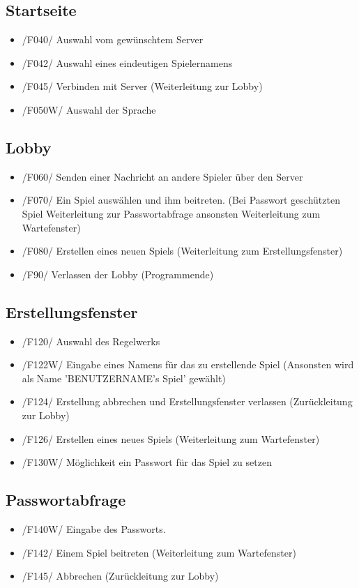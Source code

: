 \documentclass{article}
\begin{document}
\subsection{Startseite}
\begin{itemize}
	\item /F040/ Auswahl vom gewünschtem \gls{Server} 
	\item /F042/ Auswahl eines eindeutigen Spielernamens
	\item /F045/ Verbinden mit Server (Weiterleitung zur \gls{Lobby})
	\item /F050W/ Auswahl der Sprache
\end{itemize}

\subsection{\gls{Lobby}}
\begin{itemize}
	\item /F060/ Senden einer Nachricht an andere Spieler über den \gls{Server}
	\item /F070/ Ein Spiel auswählen und ihm beitreten. (Bei Passwort geschützten Spiel Weiterleitung zur Passwortabfrage ansonsten Weiterleitung zum \gls{Wartefenster})
	\item /F080/ Erstellen eines neuen Spiels (Weiterleitung zum \gls{Erstellungsfenster})
	\item /F90/ Verlassen der \gls{Lobby} (Programmende)
\end{itemize}

\subsection{\gls{Erstellungsfenster}}
\begin{itemize}
	\item /F120/ Auswahl des \gls{Regelwerk}s
	\item /F122W/ Eingabe eines Namens für das zu erstellende Spiel (Ansonsten wird als Name 'BENUTZERNAME's Spiel' gewählt)
	\item /F124/ Erstellung abbrechen und \gls{Erstellungsfenster} verlassen (Zurückleitung zur \gls{Lobby})
	\item /F126/ Erstellen eines neues Spiels (Weiterleitung zum \gls{Wartefenster})
	\item /F130W/ Möglichkeit ein Passwort für das Spiel zu setzen
\end{itemize}

\subsection{Passwortabfrage}
\begin{itemize}
	\item /F140W/ Eingabe des Passworts.
	\item /F142/ Einem Spiel beitreten (Weiterleitung zum \gls{Wartefenster})
	\item /F145/ Abbrechen (Zurückleitung zur \gls{Lobby})
\end{itemize}
\end{document}
